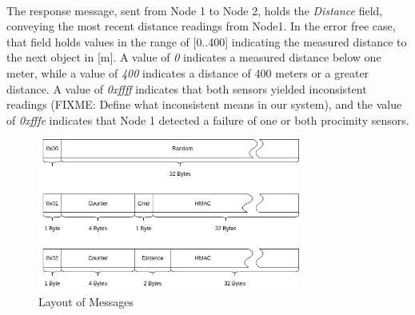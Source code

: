 \paragraph{} The response message, sent from Node 1 to Node 2, holds the \emph{Distance} field, conveying the most recent distance readings from Node1. In the error free case, that field holds values in the range of [0..400] indicating the measured distance to the next object in [m]. A value of \emph{0} indicates a measured distance below one meter, while a value of \emph{400} indicates a distance of 400 meters or a greater distance. A value of \emph{0xffff} indicates that both sensors yielded inconsistent readings (FIXME: Define what inconsistent means in our system), and the value of \emph{0xfffe} indicates that Node 1 detected a failure of one or both procimity sensors.


\begin{figure}[h]
	\includegraphics[height=50mm]{images/MessageLayout.png}
	\centering
	\caption{Layout of Messages}
	\label{fig:msg}
\end{figure}
